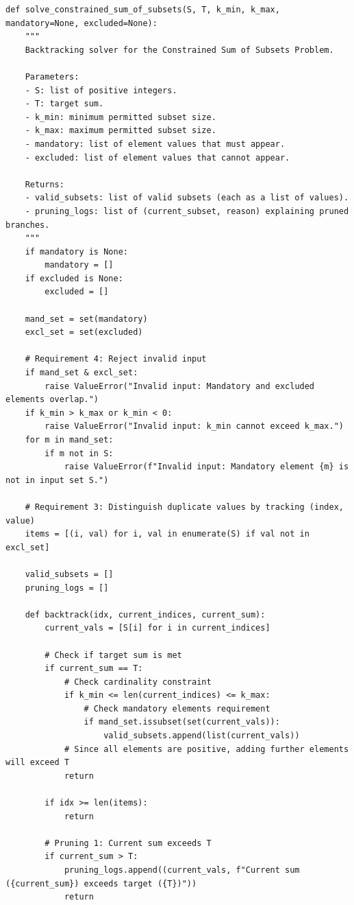\documentclass[12pt]{article}
\begin{document}
\begin{lstlisting}[style=code]
def solve_constrained_sum_of_subsets(S, T, k_min, k_max, mandatory=None, excluded=None):
    """
    Backtracking solver for the Constrained Sum of Subsets Problem.
    
    Parameters:
    - S: list of positive integers.
    - T: target sum.
    - k_min: minimum permitted subset size.
    - k_max: maximum permitted subset size.
    - mandatory: list of element values that must appear.
    - excluded: list of element values that cannot appear.
    
    Returns:
    - valid_subsets: list of valid subsets (each as a list of values).
    - pruning_logs: list of (current_subset, reason) explaining pruned branches.
    """
    if mandatory is None:
        mandatory = []
    if excluded is None:
        excluded = []

    mand_set = set(mandatory)
    excl_set = set(excluded)

    # Requirement 4: Reject invalid input
    if mand_set & excl_set:
        raise ValueError("Invalid input: Mandatory and excluded elements overlap.")
    if k_min > k_max or k_min < 0:
        raise ValueError("Invalid input: k_min cannot exceed k_max.")
    for m in mand_set:
        if m not in S:
            raise ValueError(f"Invalid input: Mandatory element {m} is not in input set S.")

    # Requirement 3: Distinguish duplicate values by tracking (index, value)
    items = [(i, val) for i, val in enumerate(S) if val not in excl_set]

    valid_subsets = []
    pruning_logs = []

    def backtrack(idx, current_indices, current_sum):
        current_vals = [S[i] for i in current_indices]

        # Check if target sum is met
        if current_sum == T:
            # Check cardinality constraint
            if k_min <= len(current_indices) <= k_max:
                # Check mandatory elements requirement
                if mand_set.issubset(set(current_vals)):
                    valid_subsets.append(list(current_vals))
            # Since all elements are positive, adding further elements will exceed T
            return

        if idx >= len(items):
            return

        # Pruning 1: Current sum exceeds T
        if current_sum > T:
            pruning_logs.append((current_vals, f"Current sum ({current_sum}) exceeds target ({T})"))
            return


\end{lstlisting}
\end{document}
